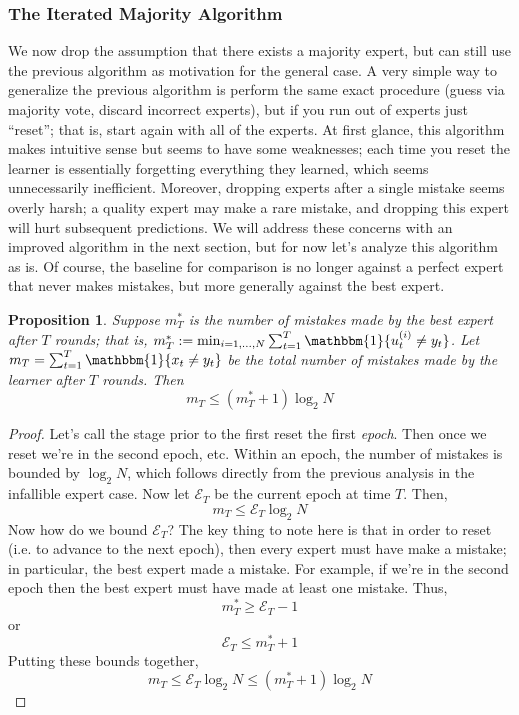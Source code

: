 \documentclass[12pt]{article}
\newtheorem{prop}{Proposition}
\begin{document}
\subsubsection{The Iterated Majority Algorithm}
We now drop the assumption that there exists a majority expert, but can still use the previous algorithm as motivation for the general case. A very simple way to generalize the previous algorithm
is perform the same exact procedure (guess via majority vote, discard incorrect experts), but if you run out of experts just ``reset''; that is, start again with all of the experts. At first glance, this algorithm
makes intuitive sense but seems to have some weaknesses; each time you reset the learner is essentially forgetting everything they learned, which seems unnecessarily inefficient. Moreover, dropping
experts after a single mistake seems overly harsh; a quality expert may make a rare mistake, and dropping this expert will hurt subsequent predictions. We will address these concerns with an improved
algorithm in the next section, but for now let's analyze this algorithm as is. Of course, the baseline for comparison is no longer against a perfect expert that never makes mistakes, but more generally 
against the best expert. 
\begin{prop}
Suppose $m^*_T$ is the number of mistakes made by the best expert after $T$ rounds; that is, $m^*_T := \min_{i = 1, \dots, N} \sum_{t = 1}^{T} \mathbbm{1}\{u^{(i)}_t \neq y_t\}$. 
Let $m_T = \sum_{t = 1}^{T} \mathbbm{1}\{x_t \neq y_t\}$ be the total number of mistakes made by the learner after $T$ rounds. Then 
\[m_T \leq (m_T^* + 1)\log_2 N\]
\end{prop}

\begin{proof}
Let's call the stage prior to the first reset the first \textit{epoch}. Then once we reset we're in the second epoch, etc. Within an epoch, the number of mistakes is bounded by $\log_2 N$, which follows 
directly from the previous analysis in the infallible expert case. Now let $\mathcal{E}_T$ be the current epoch at time $T$. Then, 
\[m_T \leq \mathcal{E}_T \log_2 N\]
Now how do we bound $\mathcal{E}_T$? The key thing to note here is that in order to reset (i.e. to advance to the next epoch), then every expert must have make a mistake; in particular, the best expert
made a mistake. For example, if we're in the second epoch then the best expert must have made at least one mistake. Thus, 
\[m^*_T \geq \mathcal{E}_T - 1\]
or 
\[\mathcal{E}_T \leq m^*_T + 1\]
Putting these bounds together, 
\[m_T \leq \mathcal{E}_T \log_2 N \leq (m^*_T + 1) \log_2 N\]
\end{proof}
\end{document}
